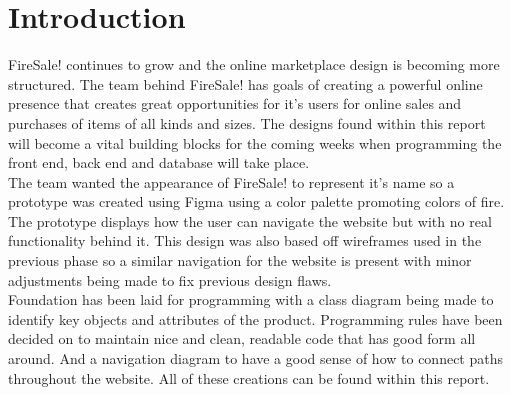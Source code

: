 \section{Introduction}

FireSale! continues to grow and the online marketplace design is becoming more structured. The team behind FireSale! has goals of creating a powerful online presence that creates great opportunities for it's users for online sales and purchases of items of all kinds and sizes. The designs found within this report will become a vital building blocks for the coming weeks when programming the front end, back end and database will take place. \\

\noindent The team wanted the appearance of FireSale! to represent it's name so a prototype was created using Figma using a color palette promoting colors of fire. The prototype displays how the user can navigate the website but with no real functionality behind it. This design was also based off wireframes used in the previous phase so a similar navigation for the website is present with minor adjustments being made to fix previous design flaws. \\

\noindent Foundation has been laid for programming with a class diagram being made to identify key objects and attributes of the product. Programming rules have been decided on to maintain nice and clean, readable code that has good form all around. And a navigation diagram to have a good sense of how to connect paths throughout the website. All of these creations can be found within this report. 